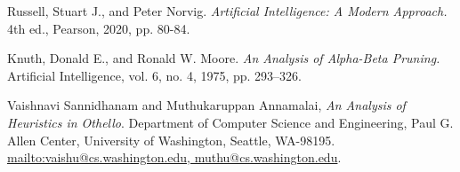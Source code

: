 \documentclass[11pt]{article}
\begin{document}
\begin{thebibliography}{9}
Russell, Stuart J., and Peter Norvig. 
\emph{Artificial Intelligence: A Modern Approach.} 
4th ed., Pearson, 2020, pp. 80-84.

Knuth, Donald E., and Ronald W. Moore. 
\emph{An Analysis of Alpha-Beta Pruning.} 
Artificial Intelligence, vol. 6, no. 4, 1975, pp. 293–326.

Vaishnavi Sannidhanam and Muthukaruppan Annamalai, 
\emph{An Analysis of Heuristics in Othello}. 
Department of Computer Science and Engineering, Paul G. Allen Center, University of Washington, Seattle, WA-98195. \url{mailto:vaishu@cs.washington.edu, muthu@cs.washington.edu}.

\end{thebibliography}
\end{document}
